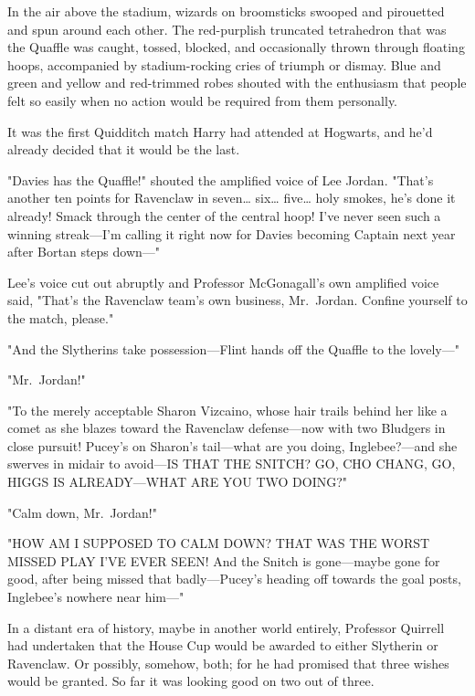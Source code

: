In the air above the stadium, wizards on broomsticks swooped and pirouetted and 
spun around each other. The red-purplish truncated tetrahedron that was the 
Quaffle was caught, tossed, blocked, and occasionally thrown through floating 
hoops, accompanied by stadium-rocking cries of triumph or dismay. Blue and 
green and yellow and red-trimmed robes shouted with the enthusiasm that people 
felt so easily when no action would be required from them personally.

It was the first Quidditch match Harry had attended at Hogwarts, and he'd 
already decided that it would be the last.

"Davies has the Quaffle!" shouted the amplified voice of Lee Jordan. "That's 
another ten points for Ravenclaw in seven{\ldots} six{\ldots} five{\ldots} holy 
smokes, he's done it already! Smack through the center of the central hoop! 
I've never seen such a winning streak---I'm calling it right now for Davies 
becoming Captain next year after Bortan steps down---"

Lee's voice cut out abruptly and Professor McGonagall's own amplified voice 
said, "That's the Ravenclaw team's own business, Mr.~Jordan. Confine yourself 
to the match, please."

"And the Slytherins take possession---Flint hands off the Quaffle to the 
lovely---"

"Mr.~Jordan!"

"To the merely acceptable Sharon Vizcaino, whose hair trails behind her like a 
comet as she blazes toward the Ravenclaw defense---now with two Bludgers in 
close pursuit! Pucey's on Sharon's tail---what are you doing, Inglebee?---and 
she swerves in midair to avoid---IS THAT THE SNITCH? GO, CHO CHANG, GO, HIGGS 
IS ALREADY---WHAT ARE YOU TWO DOING?"

"Calm down, Mr.~Jordan!"

"HOW AM I SUPPOSED TO CALM DOWN? THAT WAS THE WORST MISSED PLAY I'VE EVER SEEN! 
And the Snitch is gone---maybe gone for good, after being missed that 
badly---Pucey's heading off towards the goal posts, Inglebee's nowhere near 
him---"

In a distant era of history, maybe in another world entirely, Professor 
Quirrell had undertaken that the House Cup would be awarded to either Slytherin 
or Ravenclaw. Or possibly, somehow, both; for he had promised that three wishes 
would be granted. So far it was looking good on two out of three.

